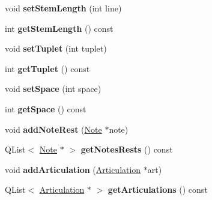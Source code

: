 \begin{DoxyCompactItemize}
void {\bfseries set\+Stem\+Length} (int line)
\item 
\mbox{\label{class_o_v_e_1_1_note_container_ad8732a8c3aa601d978bc09eb2c840c00}} 
int {\bfseries get\+Stem\+Length} () const
\item 
\mbox{\label{class_o_v_e_1_1_note_container_a70e33a5e22b53bd41dcb3a54cacb50ef}} 
void {\bfseries set\+Tuplet} (int tuplet)
\item 
\mbox{\label{class_o_v_e_1_1_note_container_abbacf21ea2379a5e0ffd05990c871784}} 
int {\bfseries get\+Tuplet} () const
\item 
\mbox{\label{class_o_v_e_1_1_note_container_a4aa7801d14ff03e4a709f01d8986a476}} 
void {\bfseries set\+Space} (int space)
\item 
\mbox{\label{class_o_v_e_1_1_note_container_a6abc2570e336c0fb0139c34daedc8ebb}} 
int {\bfseries get\+Space} () const
\item 
\mbox{\label{class_o_v_e_1_1_note_container_af2381ebb154120d4914c5d8ca48918b0}} 
void {\bfseries add\+Note\+Rest} (\hyperlink{class_o_v_e_1_1_note}{Note} $\ast$note)
\item 
\mbox{\label{class_o_v_e_1_1_note_container_ac4c638ca1404e6a6d201fabb71910e55}} 
Q\+List$<$ \hyperlink{class_o_v_e_1_1_note}{Note} $\ast$ $>$ {\bfseries get\+Notes\+Rests} () const
\item 
\mbox{\label{class_o_v_e_1_1_note_container_a6d12e32788053d4a0a3c7fee4700a9e9}} 
void {\bfseries add\+Articulation} (\hyperlink{class_o_v_e_1_1_articulation}{Articulation} $\ast$art)
\item 
\mbox{\label{class_o_v_e_1_1_note_container_a67d589573bccb88bcb8e1d96f6872fdf}} 
Q\+List$<$ \hyperlink{class_o_v_e_1_1_articulation}{Articulation} $\ast$ $>$ {\bfseries get\+Articulations} () const
\item 
\mbox{\label{class_o_v_e_1_1_note_container_a4b32a6aa801ce8b9975ed6eb9a7e5354}} 

\end{DoxyCompactItemize}
